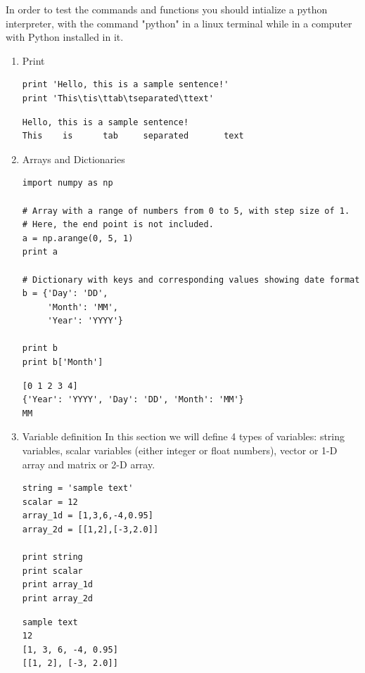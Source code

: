\documentclass[11pt]{article}
\begin{document}
In order to test the commands and functions you should intialize a python interpreter, with the command "python" in a linux terminal while in a computer with Python installed in it.
\begin{enumerate}
\item Print
\label{sec-2-2-2-1}
\begin{verbatim}
print 'Hello, this is a sample sentence!'
print 'This\tis\ttab\tseparated\ttext'
\end{verbatim}

\begin{verbatim}
Hello, this is a sample sentence!
This    is      tab     separated       text
\end{verbatim}

\item Arrays and Dictionaries
\label{sec-2-2-2-2}
\begin{verbatim}
import numpy as np

# Array with a range of numbers from 0 to 5, with step size of 1.
# Here, the end point is not included.
a = np.arange(0, 5, 1)
print a

# Dictionary with keys and corresponding values showing date format
b = {'Day': 'DD',
     'Month': 'MM',
     'Year': 'YYYY'}

print b
print b['Month']
\end{verbatim}

\begin{verbatim}
[0 1 2 3 4]
{'Year': 'YYYY', 'Day': 'DD', 'Month': 'MM'}
MM
\end{verbatim}

\item Variable definition
\label{sec-2-2-2-3}
In this section we will define 4 types of variables: string variables, scalar variables (either integer or float numbers), vector or 1-D array and matrix or 2-D array.
\begin{verbatim}
string = 'sample text'
scalar = 12
array_1d = [1,3,6,-4,0.95]
array_2d = [[1,2],[-3,2.0]]

print string 
print scalar
print array_1d
print array_2d
\end{verbatim}

\begin{verbatim}
sample text
12
[1, 3, 6, -4, 0.95]
[[1, 2], [-3, 2.0]]
\end{verbatim}
\end{enumerate}
\end{document}
